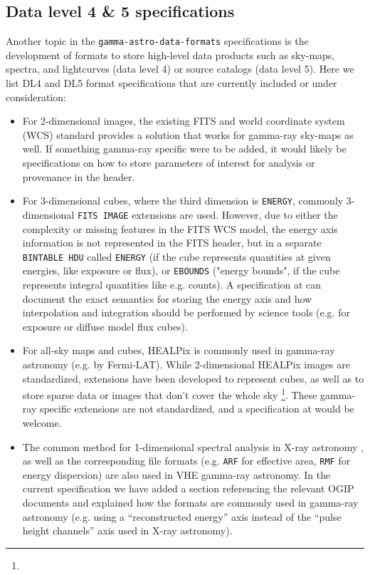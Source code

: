 \subsection{Data level 4 \& 5 specifications}

Another topic in the \texttt{gamma-astro-data-formats} specifications is the development of formats to store high-level data products such as sky-maps, spectra, and lightcurves (data level 4) or source catalogs (data level 5).  Here we list DL4 and DL5 format specifications that are currently included or under consideration:
%
\begin{itemize}
\item{} For 2-dimensional images, the existing FITS and world coordinate system (WCS) standard provides a solution that works for gamma-ray sky-maps as well. If something gamma-ray specific were to be added, it would likely be specifications on how to store parameters of interest for analysis or provenance in the header.
\item{} For 3-dimensional cubes, where the third dimension is \texttt{ENERGY}, commonly 3-dimensional \texttt{FITS IMAGE} extensions are used. However, due to either the complexity or missing features in the FITS WCS model, the energy axis information is not represented in the FITS header, but in a separate \texttt{BINTABLE HDU} called \texttt{ENERGY} (if the cube represents quantities at given energies, like exposure or flux), or \texttt{EBOUNDS} ("energy bounds", if the cube represents integral quantities like e.g. counts).
A specification at \gadf can document the exact semantics for storing the energy axis and how interpolation and integration should be performed by science tools (e.g. for exposure or diffuse model flux cubes).
\item{} For all-sky maps and cubes, HEALPix\cite{2005ApJ...622..759G} is commonly used in gamma-ray astronomy (e.g. by Fermi-LAT). While 2-dimensional HEALPix images are standardized, extensions have been developed to represent cubes, as well as to store sparse data or images that don't cover the whole sky \footnote{\pointlikedata}. These gamma-ray specific extensions are not standardized, and a specification at \gadf would be welcome.
\item{} The common method for 1-dimensional spectral analysis in X-ray astronomy \citep{Davis:2001}, as well as the corresponding file formats (e.g. \texttt{ARF} for effective area, \texttt{RMF} for energy dispersion) are also used in VHE gamma-ray astronomy. In the current specification we have added a section referencing the relevant OGIP documents and explained how the formats are commonly used in gamma-ray astronomy (e.g. using a ``reconstructed energy'' axis instead of the ``pulse height channels'' axis used in X-ray astronomy).

\end{itemize}

